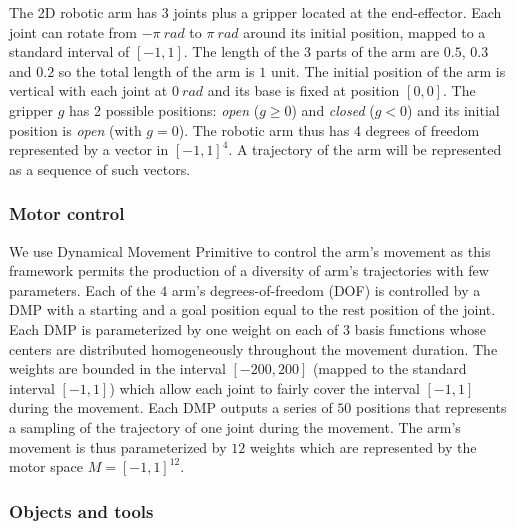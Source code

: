 \documentclass[10pt,letterpaper]{article}
\begin{document}
			The 2D robotic arm has 3 joints plus a gripper located at the end-effector.
			Each joint can rotate from $-\pi~rad$ to $\pi~rad$ around its initial position, mapped to a standard interval of $[-1,1]$.
			The length of the 3 parts of the arm are $0.5$, $0.3$ and $0.2$ so the total length of the arm is $1$ unit.
			The initial position of the arm is vertical with each joint at $0~rad$ and its base is fixed at position $[0, 0]$.
			The gripper $g$ has 2 possible positions: \textit{open} ($g \geq 0$) and \textit{closed} ($g < 0$) and its initial position is \textit{open} (with $g = 0$).
			The robotic arm thus has 4 degrees of freedom represented by a vector in $[-1,1]^4$.
			A trajectory of the arm will be represented as a sequence of such vectors.\\
		
		
		\subsubsection{Motor control}
		
			We use Dynamical Movement Primitive \cite{ijspeert_dynamical_2013} to control the arm's movement as this framework permits the production of a diversity of arm's trajectories with few parameters.
			Each of the $4$ arm's degrees-of-freedom (DOF) is controlled by a DMP with a starting and a goal position equal to the rest position of the joint.
			Each DMP is parameterized by one weight on each of $3$ basis functions whose centers are distributed homogeneously throughout the movement duration.
			The weights are bounded in the interval $[-200,200]$ (mapped to the standard interval $[-1,1]$) which allow each joint to fairly cover the interval $[-1,1]$ during the movement.
			Each DMP outputs a series of $50$ positions that represents a sampling of the trajectory of one joint during the movement.		
			The arm's movement is thus parameterized by $12$ weights which are represented by the motor space $M=[-1,1]^{12}$.\\
		
			
		\subsubsection{Objects and tools}
			
\end{document}
